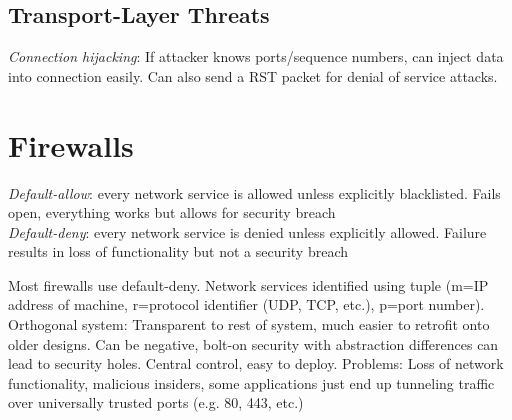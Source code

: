 \documentclass[10pt,landscape]{article}
\begin{document}
\begin{multicols}{3}
\subsection{Transport-Layer Threats}

\textit{Connection hijacking}: If attacker knows ports/sequence numbers, can inject data into connection easily. Can also send a RST packet for denial of service attacks.



\section{Firewalls}

\textit{Default-allow}: every network service is allowed unless explicitly blacklisted. Fails open, everything works but allows for security breach \\
\textit{Default-deny}: every network service is denied unless explicitly allowed. Failure results in loss of functionality but not a security breach

Most firewalls use default-deny. Network services identified using tuple (m=IP address of machine, r=protocol identifier (UDP, TCP, etc.), p=port number). Orthogonal system: Transparent to rest of system, much easier to retrofit onto older designs. Can be negative, bolt-on security with abstraction differences can lead to security holes. Central control, easy to deploy. Problems: Loss of network functionality, malicious insiders, some applications just end up tunneling traffic over universally trusted ports (e.g. 80, 443, etc.)


\end{multicols}
\end{document}
